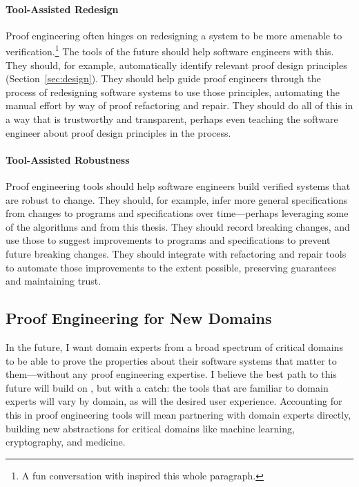 \paragraph{Tool-Assisted Redesign} 
Proof engineering often hinges on redesigning a system to be more amenable to verification.\footnote{A fun conversation with  inspired this whole paragraph.}
The tools of the future should help software engineers with this.
They should, for example, automatically identify relevant proof design principles (Section~\ref{sec:design}).
They should help guide proof engineers through the process of redesigning software systems to use those principles,
automating the manual effort by way of proof refactoring and repair.
They should do all of this in a way that is trustworthy and transparent,
perhaps even teaching the software engineer about proof design principles in the process.

\paragraph{Tool-Assisted Robustness}
Proof engineering tools should help software engineers build verified systems that are robust to change.
They should, for example, infer more general specifications from changes to programs and specifications over time---perhaps
leveraging some of the  algorithms and  from this thesis.
They should record breaking changes, and use those to suggest improvements to programs and specifications to prevent future breaking changes.
They should integrate with refactoring and repair tools to automate those improvements to the extent possible,
preserving guarantees and maintaining trust.

\subsection*{Proof Engineering for New Domains}

In the future, I want domain experts from a broad spectrum of critical domains to be able to prove the properties
about their software systems that matter to them---without any proof engineering expertise.
I believe the best path to this future will build on , but with a catch:
the tools that are familiar to domain experts will vary by domain, as will the desired user experience.
Accounting for this in proof engineering tools will mean partnering with domain experts directly,
building new abstractions for critical domains like machine learning, cryptography, and medicine.


